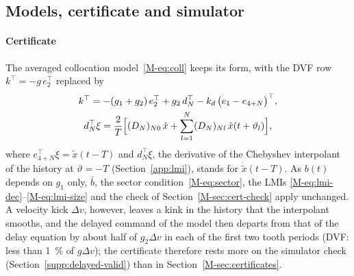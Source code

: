 \subsection{Models, certificate and simulator}\label{supp:delayed-model}

\paragraph{Certificate}
The averaged collocation model~\eqref{M-eq:coll} keeps its form, with the DVF row $k^\top=-g\,e_2^\top$ replaced by
\begin{equation*}
  \begin{gathered}
    k^\top=-(g_1+g_2)\,e_2^\top+g_2\,d_N^\top-k_d\,\bigl(e_1-e_{4+N}\bigr)^\top,\\
    d_N^\top\xi=\frac2T\Bigl[(D_N)_{N0}\,\tilde x+\sum_{l=1}^{N}(D_N)_{Nl}\,\tilde x(t+\vartheta_l)\Bigr],
  \end{gathered}
\end{equation*}
where $e_{4+N}^\top\xi=\tilde x(t-T)$ and $d_N^\top\xi$, the derivative of the Chebyshev interpolant of the history at $\vartheta=-T$ (Section~\ref{app:lmi}), stands for $\dot{\tilde x}(t-T)$. As $b(t)$ depends on $g_1$ only, $\bar b$, the sector condition~\eqref{M-eq:sector}, the LMIs \eqref{M-eq:lmi-dec}--\eqref{M-eq:lmi-size} and the check of Section~\ref{M-sec:cert-check} apply unchanged. A velocity kick $\Delta v$, however, leaves a kink in the history that the interpolant smooths, and the delayed command of the model then departs from that of the delay equation by about half of $g_2\Delta v$ in each of the first two tooth periods (DVF: less than \SI{1}{\percent} of $g\Delta v$); the certificate therefore rests more on the simulator check (Section~\ref{supp:delayed-valid}) than in Section~\ref{M-sec:certificates}.

